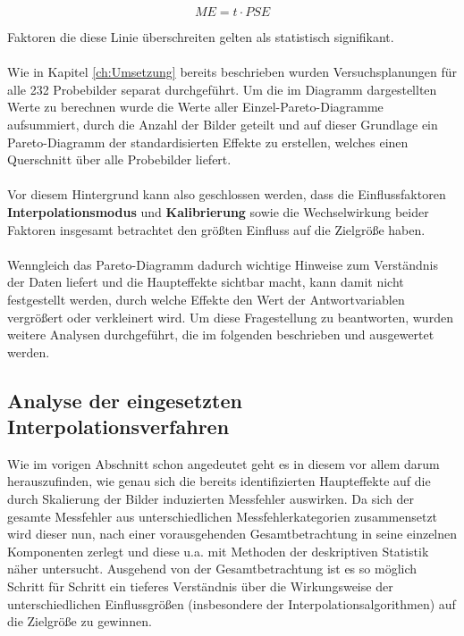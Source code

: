 \documentclass[
fontsize=10pt, 
listof = totoc,
parskip = half	
]{report}
\begin{document}
\begin{equation}
	ME = t\cdot PSE
\end{equation}

\noindent Faktoren die diese Linie überschreiten gelten als statistisch signifikant. 
\\\\
Wie in Kapitel \ref{ch:Umsetzung} bereits beschrieben wurden Versuchsplanungen für alle 232 Probebilder separat durchgeführt. Um die im Diagramm dargestellten Werte zu berechnen wurde die Werte aller Einzel-Pareto-Diagramme aufsummiert, durch die Anzahl der Bilder geteilt und auf dieser Grundlage ein Pareto-Diagramm der standardisierten Effekte zu erstellen, welches einen Querschnitt über  alle Probebilder liefert.
\\\\
\noindent Vor diesem Hintergrund kann also geschlossen werden, dass die Einflussfaktoren \textbf{Interpolationsmodus} und \textbf{Kalibrierung} sowie die Wechselwirkung beider Faktoren insgesamt betrachtet den größten Einfluss auf die Zielgröße haben.
\\\\
\noindent Wenngleich das Pareto-Diagramm dadurch wichtige Hinweise zum Verständnis der Daten liefert und die Haupteffekte sichtbar macht, kann damit nicht festgestellt werden, durch welche Effekte den Wert der Antwortvariablen vergrößert oder verkleinert wird. Um diese Fragestellung zu beantworten, wurden weitere Analysen durchgeführt, die im folgenden beschrieben und ausgewertet werden.


\subsection{Analyse der eingesetzten Interpolationsverfahren}

Wie im vorigen Abschnitt schon angedeutet geht es in diesem vor allem darum herauszufinden, wie genau sich die bereits identifizierten Haupteffekte auf die durch Skalierung der Bilder induzierten Messfehler auswirken. Da sich der gesamte Messfehler aus unterschiedlichen Messfehlerkategorien zusammensetzt wird dieser nun, nach einer vorausgehenden Gesamtbetrachtung in seine einzelnen Komponenten zerlegt und diese u.a. mit Methoden der deskriptiven Statistik näher untersucht. Ausgehend von der Gesamtbetrachtung ist es so möglich Schritt für Schritt ein tieferes Verständnis über die Wirkungsweise der unterschiedlichen Einflussgrößen (insbesondere der Interpolationsalgorithmen) auf die Zielgröße zu gewinnen.
\end{document}
